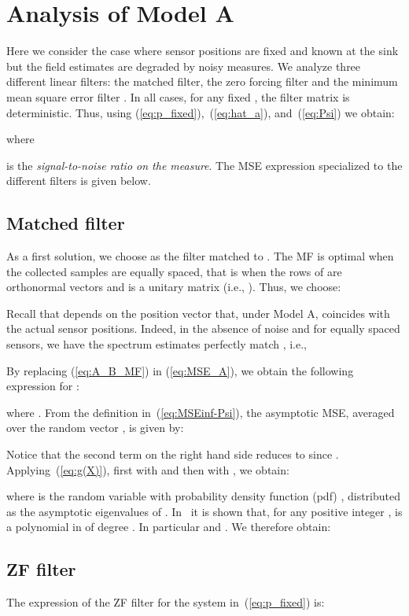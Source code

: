 \documentclass[final, a4paper]{IEEEtran}
\begin{document}
\section{Analysis of Model A}
\label{sec:model_A}

Here we consider the case where sensor positions are fixed and known
at the sink but the field estimates are degraded by noisy measures.
We analyze three different linear filters: the matched filter, the
zero forcing filter and the minimum mean square error filter
\cite{Verdu_book}.
In all cases, for any fixed , the filter matrix  is deterministic.
Thus, using (\ref{eq:p_fixed}),~(\ref{eq:hat_a}), and~(\ref{eq:Psi}) we obtain:

where

is the {\em signal-to-noise ratio on the measure}.
The MSE expression specialized to the different filters is given below.



\subsection{Matched filter}
As a first solution, we choose  as the filter matched to
. The MF is optimal  when the collected samples are equally
spaced,  that is when the rows of  are orthonormal
vectors and  is a unitary matrix (i.e.,
). Thus, we choose:

Recall that  depends on the position vector  that,
under Model A, coincides with the actual sensor positions.
Indeed, in the absence of noise and for equally spaced sensors, we have
the spectrum estimates perfectly match , i.e.,


By replacing (\ref{eq:A_B_MF}) in (\ref{eq:MSE_A}), we obtain the following
expression for :

where .
From the definition in~(\ref{eq:MSEinf-Psi}), the asymptotic MSE,
averaged over the random vector , is given by:

Notice that the second term on the right hand side reduces to  since .
Applying~(\ref{eq:g(X)}),  first with  and then with , we obtain:

where  is the random variable with probability density function (pdf)
, distributed as the asymptotic eigenvalues of .
 In~\cite{NordioChiasseriniViterbo} it is shown that, for any positive integer ,
 is a polynomial in  of degree .
In particular  and . We therefore obtain:




\subsection{ZF filter}
\label{sec:A_ZF}
The expression of the ZF filter for the system in~(\ref{eq:p_fixed}) is:
\end{document}
